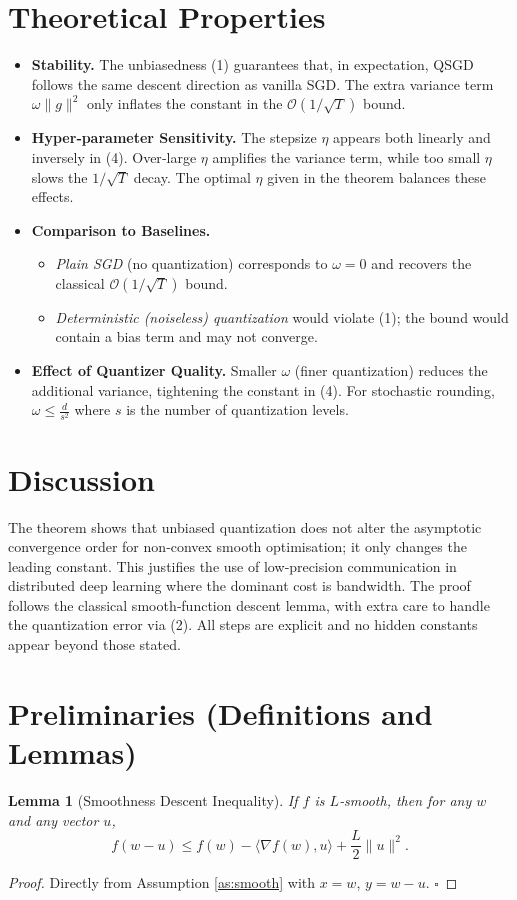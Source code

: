 \documentclass{article}
\newtheorem{lemma}{Lemma}
\begin{document}
\section*{Theoretical Properties}
\begin{itemize}
\item \textbf{Stability.} The unbiasedness (1) guarantees that, in expectation, QSGD follows the same descent direction as vanilla SGD. The extra variance term $\omega\|g\|^{2}$ only inflates the constant in the $\mathcal{O}(1/\sqrt{T})$ bound.
\item \textbf{Hyper‑parameter Sensitivity.} The stepsize $\eta$ appears both linearly and inversely in (4). Over‑large $\eta$ amplifies the variance term, while too small $\eta$ slows the $1/\sqrt{T}$ decay. The optimal $\eta$ given in the theorem balances these effects.
\item \textbf{Comparison to Baselines.}
    \begin{itemize}
        \item \emph{Plain SGD} (no quantization) corresponds to $\omega=0$ and recovers the classical $\mathcal{O}(1/\sqrt{T})$ bound.
        \item \emph{Deterministic (noiseless) quantization} would violate (1); the bound would contain a bias term and may not converge.
    \end{itemize}
\item \textbf{Effect of Quantizer Quality.} Smaller $\omega$ (finer quantization) reduces the additional variance, tightening the constant in (4). For stochastic rounding, $\omega\le \frac{d}{s^{2}}$ where $s$ is the number of quantization levels.
\end{itemize}

\section*{Discussion}
The theorem shows that unbiased quantization does not alter the asymptotic convergence order for non‑convex smooth optimisation; it only changes the leading constant. This justifies the use of low‑precision communication in distributed deep learning where the dominant cost is bandwidth. The proof follows the classical smooth‑function descent lemma, with extra care to handle the quantization error via (2). All steps are explicit and no hidden constants appear beyond those stated.

\section*{Preliminaries (Definitions and Lemmas)}
\begin{lemma}[Smoothness Descent Inequality]\label{lem:smooth}
If $f$ is $L$‑smooth, then for any $w$ and any vector $u$,
\[
f(w-u)\le f(w)-\langle\nabla f(w),u\rangle+\frac{L}{2}\|u\|^{2}. \tag{5}
\]
\end{lemma}
\begin{proof}
Directly from Assumption \ref{as:smooth} with $x=w$, $y=w-u$. \hfill $\square$
\end{proof}
\end{document}
